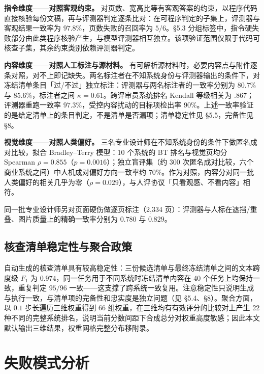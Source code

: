 \textbf{指令维度------对照客观约束。} 对页数、宽高比等有客观答案的约束，以程序代码直接核验每份文稿，再与评测器判定逐条比对：在可程序判定的子集上，评测器与客观结果一致率为 \(97.8\%\)，页数失败的召回率为 \(5/6\)。§5.3 分组标签中，指令硬失败部分由此类程序核验产生，与模型评测器相互独立。该项验证范围仅限于代码可核查子集，其余约束类别依赖评测器判定。

\textbf{内容维度------对照人工标注与源材料。} 有可解析源材料时，必要内容点与附件逐条对照，对不上即记缺失。两名标注者在不知系统身份与评测器输出的条件下，对冻结清单条目「过/不过」独立标注：评测器与两名标注者的一致率分别为 \(80.7\%\) 与 \(85.6\%\)，标注者之间 \(\kappa{=}0.61\)。跨评审员系统排名 Kendall 等级相关为 \(.867\)；评测器重跑一致率 \(97.3\%\)，受控内容扰动的目标项检出率 \(90\%\)。上述一致率验证的是给定清单上的条目判定，不是清单是否漏项；清单稳定性见 §5.5，完备性见 §8。

\textbf{视觉维度------对照人类偏好。} 三名专业设计师在不知系统身份的条件下做匿名成对比较，拟合 Bradley--Terry 模型：10 个系统的 BT 排名与视觉页均分 Spearman \(\rho{=}0.855\)（\(p{=}0.0016\)）；独立盲评集（约 300 次匿名成对比较，六个商业系统之间）中人机成对偏好方向一致率约 \(70\%\)。作为对照，内容分对同一批人类偏好的相关几乎为零（\(\rho{=}0.029\)），与人评协议「只看观感、不看内容」相符。

同一批专业设计师另对页面硬伤做逐页标注（2,334 页）：评测器与人标在遮挡/重叠、图片质量上的精确一致率分别为 \(0.780\) 与 \(0.829\)。

\subsection{核查清单稳定性与聚合政策}\label{ux6838ux67e5ux6e05ux5355ux7a33ux5b9aux6027ux4e0eux805aux5408ux653fux7b56}

自动生成的核查清单具有较高稳定性：三份候选清单与最终冻结清单之间的文本跨度级 \(F_1\) 为 \(0.974\)，同一任务用于不同系统时冻结清单内容在 40 个任务上均保持一致，重复判定 \(95/96\) 一致------这支撑了跨系统一致复用。注意稳定性只说明生成与执行一致，与清单项的完备性和忠实度是独立问题（见 §5.4、§8）。聚合方面，以 \(0.1\) 步长遍历三维权重得到 66 组权重，在三维均有有效评分的比较对上产生 22 种不同的完整系统排名，说明当前分数间距下合成总分对权重高度敏感；因此本文默认输出三维结果，权重网格完整分布移附录。

\section{失败模式分析}\label{ux5931ux8d25ux6a21ux5f0fux5206ux6790}

